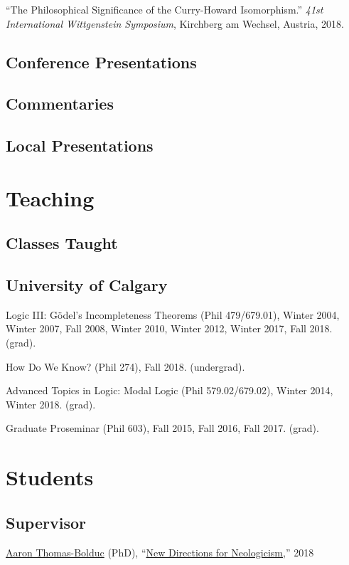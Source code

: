 \documentclass[11pt]{article}
\def\printdate#1{\xprintdate#1-}
\def\xprintdate#1-#2-#3-{#1}
\begin{document}
\ind ``The Philosophical Significance of the Curry-Howard Isomorphism.'' \emph{41st International Wittgenstein Symposium}, Kirchberg am Wechsel, Austria, \printdate{2018-08-06}.



\subsection{Conference Presentations}




\subsection{Commentaries}




\subsection{Local Presentations}


\section{Teaching}

\subsection{Classes Taught}

\subsection{University of Calgary}
\ind Logic III: Gödel's Incompleteness Theorems (Phil 479/679.01), Winter 2004, Winter 2007, Fall 2008, Winter 2010, Winter 2012, Winter
2017, Fall 2018. (grad).

\ind How Do We Know? (Phil 274), Fall 2018. (undergrad).

\ind Advanced Topics in Logic: Modal Logic (Phil 579.02/679.02), Winter 2014, Winter 2018. (grad).

\ind Graduate Proseminar (Phil 603), Fall 2015, Fall 2016, Fall 2017. (grad).


\section{Students}

\subsection{Supervisor}
\ind \href{https://hcommons.org/members/arthomasbolduc/}{Aaron Thomas-Bolduc} (PhD), ``\href{https://prism.ucalgary.ca/handle/1880/107131}{New Directions for Neologicism},'' 2018
\end{document}

